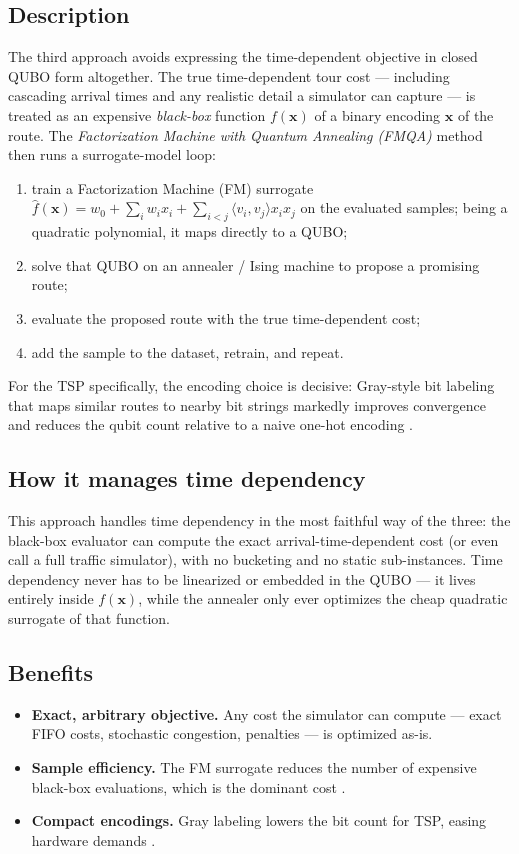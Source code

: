 \documentclass[11pt]{article}
\newcommand{\emphasize}[1]{\textcolor{emphasisblue}{\textit{#1}}}
\begin{document}
\subsection{Description}
The third approach avoids expressing the time-dependent objective in closed QUBO form
altogether. The true time-dependent tour cost --- including cascading arrival times and any
realistic detail a simulator can capture --- is treated as an expensive
\emphasize{black-box} function $f(\mathbf{x})$ of a binary encoding $\mathbf{x}$ of the
route. The \emphasize{Factorization Machine with Quantum Annealing (FMQA)} method
\cite{kitai2020designing} then runs a surrogate-model loop:
\begin{enumerate}[leftmargin=1.6em]
  \item train a Factorization Machine (FM) surrogate
        $\hat f(\mathbf{x}) = w_0 + \sum_i w_i x_i + \sum_{i<j}\langle v_i,v_j\rangle x_i x_j$
        on the evaluated samples; being a quadratic polynomial, it maps directly to a QUBO;
  \item solve that QUBO on an annealer / Ising machine to propose a promising route;
  \item evaluate the proposed route with the true time-dependent cost;
  \item add the sample to the dataset, retrain, and repeat.
\end{enumerate}
For the TSP specifically, the encoding choice is decisive: Gray-style bit labeling that
maps similar routes to nearby bit strings markedly improves convergence and reduces the
qubit count relative to a naive one-hot encoding \cite{koshikawa2024efficient}.

\subsection{How it manages time dependency}
This approach handles time dependency in the most faithful way of the three: the black-box
evaluator can compute the exact arrival-time-dependent cost (or even call a full traffic
simulator), with no bucketing and no static sub-instances. Time dependency never has to be
linearized or embedded in the QUBO --- it lives entirely inside $f(\mathbf{x})$, while the
annealer only ever optimizes the cheap quadratic surrogate of that function.

\subsection{Benefits}
\begin{itemize}[leftmargin=1.4em]
  \item \textbf{Exact, arbitrary objective.} Any cost the simulator can compute --- exact
        FIFO costs, stochastic congestion, penalties --- is optimized as-is.
  \item \textbf{Sample efficiency.} The FM surrogate reduces the number of expensive
        black-box evaluations, which is the dominant cost \cite{kitai2020designing}.
  \item \textbf{Compact encodings.} Gray labeling lowers the bit count for TSP, easing
        hardware demands \cite{koshikawa2024efficient}.
\end{itemize}
\end{document}
